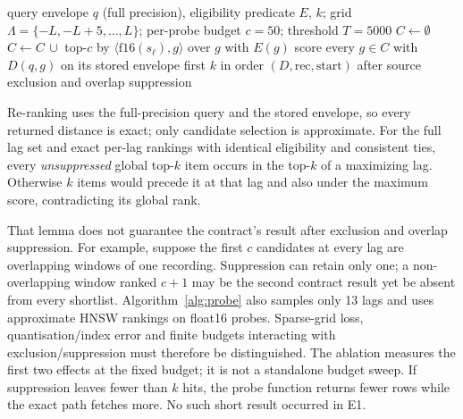 \documentclass[sigconf]{acmart}
\begin{document}
\begin{algorithm}[t]
\caption{Probe search (product function, simplified)}\label{alg:probe}
\begin{algorithmic}[1]
\Require query envelope $q$ (full precision), eligibility predicate $E$, $k$; grid $\Lambda=\{-L,-L{+}5,\dots,L\}$; per-probe budget $c=50$; threshold $T=5000$
 
  \State \Return {}
\EndIf
\State $C\gets\emptyset$
\For{$\ell\in\Lambda$}
  \State $C\gets C\,\cup$ top-$c$ by $\langle \mathrm{f16}(s_\ell), g\rangle$ over $g$ with $E(g)$ 
\EndFor
\State score every $g\in C$ with $D(q,g)$ on its stored envelope
\State \Return first $k$ in order $(D,\text{rec},\text{start})$ after source exclusion and overlap suppression
\end{algorithmic}
\end{algorithm}

Re-ranking uses the full-precision query and the stored envelope, so every returned distance is exact; only candidate selection is approximate. For the full lag set and exact per-lag rankings with identical eligibility and consistent ties, every \emph{unsuppressed} global top-$k$ item occurs in the top-$k$ of a maximizing lag. Otherwise $k$ items would precede it at that lag and also under the maximum score, contradicting its global rank.

That lemma does not guarantee the contract's result after exclusion and overlap suppression. For example, suppose the first $c$ candidates at every lag are overlapping windows of one recording. Suppression can retain only one; a non-overlapping window ranked $c+1$ may be the second contract result yet be absent from every shortlist. Algorithm~\ref{alg:probe} also samples only 13 lags and uses approximate HNSW rankings on float16 probes. Sparse-grid loss, quantisation/index error and finite budgets interacting with exclusion/suppression must therefore be distinguished. The ablation measures the first two effects at the fixed budget; it is not a standalone budget sweep. If suppression leaves fewer than $k$ hits, the probe function returns fewer rows while the exact path fetches more. No such short result occurred in E1.
\end{document}
